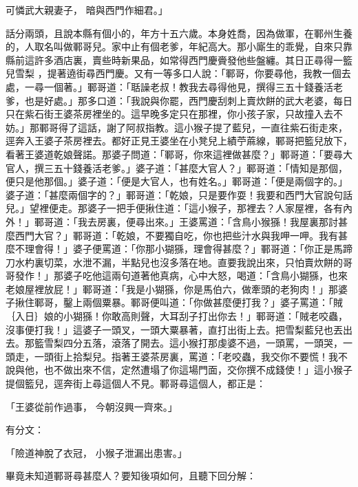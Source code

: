 可憐武大親妻子，  暗與西門作細君。」

話分兩頭，且說本縣有個小的，年方十五六歲。本身姓喬，因為做軍，在鄆州生養的，人取名叫做鄆哥兒。家中止有個老爹，年紀高大。那小廝生的乖覺，自來只靠縣前這許多酒店裏，賣些時新果品，如常得西門慶賫發他些盤纏。其日正尋得一籃兒雪梨 ，提著遶街尋西門慶。又有一等多口人說：「鄆哥，你要尋他，我教一個去處，一尋一個著。」鄆哥道：「聒譟老叔！教我去尋得他見，撰得三五十錢養活老爹，也是好處。」那多口道：「我說與你罷，西門慶刮刺上賣炊餅的武大老婆，每日只在紫石街王婆茶房裡坐的。這早晚多定只在那裡，你小孩子家，只故撞入去不妨。」那鄆哥得了這話，謝了阿叔指教。這小猴子提了藍兒，一直往紫石街走來，逕奔入王婆子茶房裡去。都好正見王婆坐在小凳兒上績苧蔴線，鄆哥把籃兒放下，看著王婆道乾娘聲諾。那婆子問道：「鄆哥，你來這裡做甚麼？」鄆哥道：「要尋大官人，撰三五十錢養活老爹。」婆子道：「甚麼大官人？」鄆哥道：「情知是那個，便只是他那個。」婆子道：「便是大官人，也有姓名。」鄆哥道：「便是兩個字的。」婆子道：「甚麼兩個字的？」鄆哥道：「乾娘，只是要作耍！我要和西門大官說句話兒。」望裡便走。那婆子一把手便揪住道：「這小猴子，那裡去？人家屋裡，各有內外！」鄆哥道：「我去房裏，便尋出來。」王婆罵道：「含鳥小猴猻！我屋裏那討甚麼西門大官？」鄆哥道：「乾娘，不要獨自吃，你也把些汁水與我呷一呷。我有甚麼不理會得！」婆子便罵道：「你那小猢猻，理會得甚麼？」鄆哥道：「你正是馬蹄刀水杓裏切菜，水泄不漏，半點兒也沒多落在地。直要我說出來，只怕賣炊餅的哥哥發作！」那婆子吃他這兩句道著他真病，心中大怒，喝道：「含鳥小猢猻，也來老娘屋裡放屁！」鄆哥道：「我是小猢猻，你是馬伯六，做牽頭的老狗肉！」那婆子揪住鄆哥，鑿上兩個粟暴。鄆哥便叫道：「你做甚麼便打我？」婆子罵道：「賊｛入日｝娘的小猢猻！你敢高則聲，大耳刮子打出你去！」鄆哥道：「賊老咬蟲，沒事便打我！」這婆子一頭叉，一頭大粟暴著，直打出街上去。把雪梨藍兒也丟出去。那籃雪梨四分五落，滾落了開去。這小猴打那虔婆不過，一頭罵，一頭哭，一頭走，一頭街上拾梨兒。指著王婆茶房裏，罵道：「老咬蟲，我交你不要慌！我不說與他，也不做出來不信，定然遭塌了你這場門面，交你撰不成錢使！」這小猴子提個籃兒，逕奔街上尋這個人不見。鄆哥尋這個人，都正是：

「王婆從前作過事，  今朝沒興一齊來。」

有分文：

「險道神脫了衣冠，  小猴子泄漏出患害。」

畢竟未知道鄆哥尋甚麼人？要知後項如何，且聽下回分解： 


